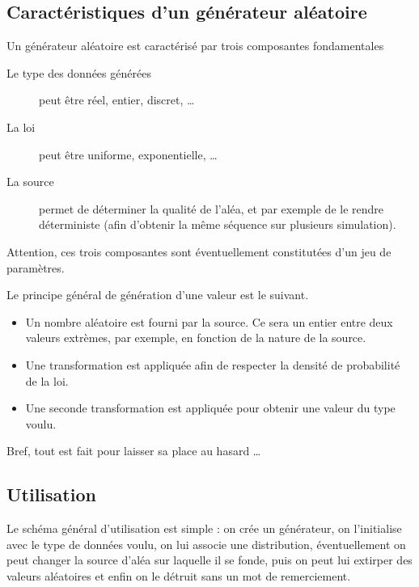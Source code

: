 \documentclass{article}
\begin{document}
%
\subsection{Caractéristiques d'un générateur aléatoire}

   Un générateur aléatoire est caractérisé par trois composantes
fondamentales 

\begin{description}
   \item[Le type des données générées] peut être réel, entier,
     discret, \ldots
   \item[La loi] peut être uniforme, exponentielle, \ldots
   \item[La source] permet de déterminer la qualité de l'aléa, et par
     exemple de le rendre déterministe (afin d'obtenir la même
     séquence sur plusieurs simulation).
\end{description}

   Attention, ces trois composantes sont éventuellement constitutées
d'un jeu de paramètres.

   Le principe général de génération d'une valeur est le suivant.

\begin{itemize}
   \item Un nombre aléatoire est fourni par la source. Ce sera un
     entier entre deux valeurs extrèmes, par exemple, en fonction de
     la nature de la source.
   \item Une transformation est appliquée afin de respecter la
     densité de probabilité de la loi.
   \item Une seconde transformation est appliquée pour obtenir une
     valeur du type voulu.
\end{itemize}

   Bref, tout est fait pour laisser sa place au hasard \ldots


%
\subsection{Utilisation}

   Le schéma général d'utilisation est simple : on crée un générateur,
on l'initialise avec le type de données voulu, on lui associe une
distribution, éventuellement on peut changer la source d'aléa sur
laquelle il se fonde, puis on peut lui extirper des valeurs aléatoires
et enfin on le détruit sans un mot de remerciement.
\end{document}

